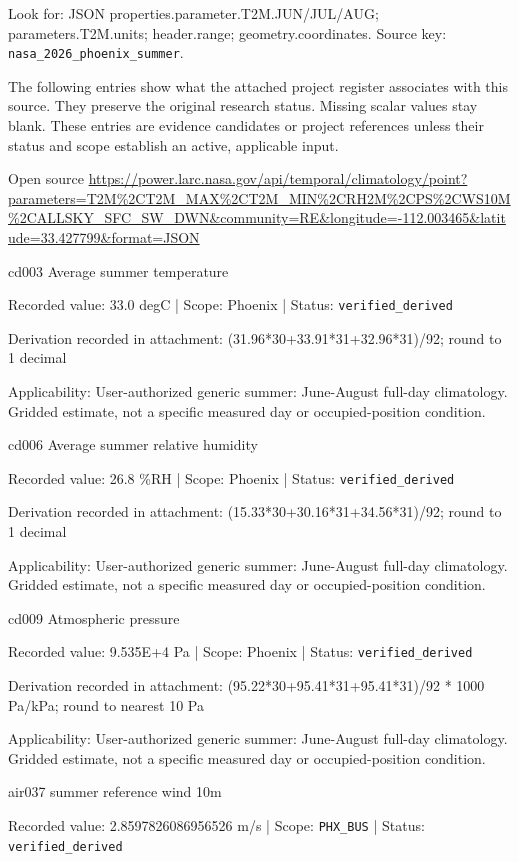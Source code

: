 Look for: JSON properties.parameter.T2M.JUN/JUL/AUG; parameters.T2M.units; header.range; geometry.coordinates. Source key: \nolinkurl{nasa_2026_phoenix_summer}.

The following entries show what the attached project register associates with this source. They preserve the original research status. Missing scalar values stay blank. These entries are evidence candidates or project references unless their status and scope establish an active, applicable input.

Open source  \url{https://power.larc.nasa.gov/api/temporal/climatology/point?parameters=T2M%2CT2M_MAX%2CT2M_MIN%2CRH2M%2CPS%2CWS10M%2CALLSKY_SFC_SW_DWN&community=RE&longitude=-112.003465&latitude=33.427799&format=JSON}

cd003  Average summer temperature

Recorded value: 33.0 degC | Scope: Phoenix | Status: \nolinkurl{verified_derived}

Derivation recorded in attachment: (31.96*30+33.91*31+32.96*31)/92; round to 1 decimal

Applicability: User-authorized generic summer: June-August full-day climatology. Gridded estimate, not a specific measured day or occupied-position condition.

cd006  Average summer relative humidity

Recorded value: 26.8 \%RH | Scope: Phoenix | Status: \nolinkurl{verified_derived}

Derivation recorded in attachment: (15.33*30+30.16*31+34.56*31)/92; round to 1 decimal

Applicability: User-authorized generic summer: June-August full-day climatology. Gridded estimate, not a specific measured day or occupied-position condition.

cd009  Atmospheric pressure

Recorded value: 9.535E+4 Pa | Scope: Phoenix | Status: \nolinkurl{verified_derived}

Derivation recorded in attachment: (95.22*30+95.41*31+95.41*31)/92 * 1000 Pa/kPa; round to nearest 10 Pa

Applicability: User-authorized generic summer: June-August full-day climatology. Gridded estimate, not a specific measured day or occupied-position condition.

air037  summer reference wind 10m

Recorded value: 2.8597826086956526 m/s | Scope: \nolinkurl{PHX_BUS} | Status: \nolinkurl{verified_derived}

